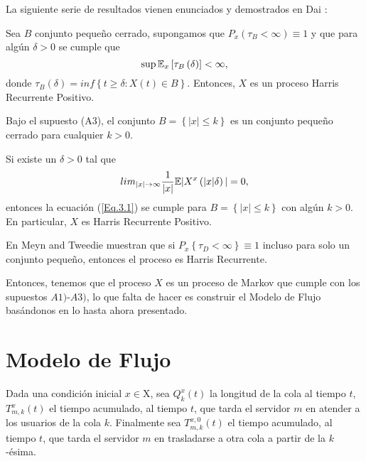 La siguiente serie de resultados vienen enunciados y demostrados
en Dai \cite{Dai}:
\begin{Lema}
Sea $B$ conjunto peque\~no cerrado, supongamos que
$P_{x}\left(\tau_{B}<\infty\right)\equiv1$ y que para alg\'un
$\delta>0$ se cumple que
\begin{equation}\label{Eq.3.1}
\sup\mathbb{E}_{x}\left[\tau_{B}\left(\delta\right)\right]<\infty,
\end{equation}
donde
$\tau_{B}\left(\delta\right)=inf\left\{t\geq\delta:X\left(t\right)\in
B\right\}$. Entonces, $X$ es un proceso Harris Recurrente
Positivo.
\end{Lema}

\begin{Lema}\label{Lema.3.}
Bajo el supuesto (A3), el conjunto $B=\left\{|x|\leq k\right\}$ es
un conjunto peque\~no cerrado para cualquier $k>0$.
\end{Lema}

\begin{Teo}\label{Tma.3.1}
Si existe un $\delta>0$ tal que
\begin{equation}
lim_{|x|\rightarrow\infty}\frac{1}{|x|}\mathbb{E}|X^{x}\left(|x|\delta\right)|=0,
\end{equation}
entonces la ecuaci\'on (\ref{Eq.3.1}) se cumple para
$B=\left\{|x|\leq k\right\}$ con alg\'un $k>0$. En particular, $X$
es Harris Recurrente Positivo.
\end{Teo}

\begin{Note}
En Meyn and Tweedie \cite{MeynTweedie} muestran que si
$P_{x}\left\{\tau_{D}<\infty\right\}\equiv1$ incluso para solo un
conjunto peque\~no, entonces el proceso es Harris Recurrente.
\end{Note}

Entonces, tenemos que el proceso $X$ es un proceso de Markov que
cumple con los supuestos $A1)$-$A3)$, lo que falta de hacer es
construir el Modelo de Flujo bas\'andonos en lo hasta ahora
presentado.
\section{Modelo de Flujo}

Dada una condici\'on inicial $x\in\textrm{X}$, sea
$Q_{k}^{x}\left(t\right)$ la longitud de la cola al tiempo $t$,
$T_{m,k}^{x}\left(t\right)$ el tiempo acumulado, al tiempo $t$,
que tarda el servidor $m$ en atender a los usuarios de la cola
$k$. Finalmente sea $T_{m,k}^{x,0}\left(t\right)$ el tiempo
acumulado, al tiempo $t$, que tarda el servidor $m$ en trasladarse
a otra cola a partir de la $k$-\'esima.\\

